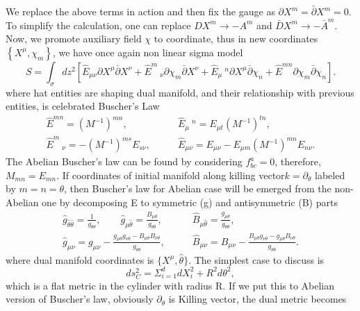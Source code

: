 \documentclass[a4paper]{article}
\begin{document}
 We replace the above terms in action and then fix the gauge as $\partial X^m = \bar{\partial} X^m = 0$. To simplify the calculation, one can replace $DX^m \rightarrow -A^m$ and $\bar{D}X^m \rightarrow -\bar{A}^m$. Now, we promote auxiliary field $\chi$ to coordinate, thus in new coordinates $\left\lbrace X^{\mu}, \chi_m \right\rbrace$, we have once again non linear sigma model
 \begin{equation}
 S= \int_\sigma dz^2 \left[ \hat{E}_{\mu \nu} \partial X^\mu \bar{\partial} X^{\nu} + \hat{E}^{m }~_{\nu} \partial \chi_m \bar{\partial} X^{\nu} + \hat{E}_{\mu }~^{n} \partial X^{\mu} \bar{\partial} \chi_{n} +  \hat{E}^{m n} \partial \chi_m \bar{\partial} \chi_{n} \right].
 \end{equation}
 where hat entities are shaping dual manifold, and their relationship with previous entities, is celebrated Buscher's Law
\begin{align} \nonumber
 \hat{E}^{m n} = (M^{-1})^{m n}, \qquad & \hat{E}_{\mu}~^{ n} = E_{\mu t} (M^{-1})^{t n},
 \\
 \hat{E}^{m}~_{ \nu} = - (M^{-1})^{m s} E_{s \nu}, \qquad &\hat{E}_{\mu \nu} = E_{\mu \nu} - E_{\mu m}(M^{-1})^{m n} E_{n \nu}.
 \end{align}
 The Abelian Buscher's law can be found by considering $f^{a}_{b c} = 0$, therefore, $M_{m n}=E_{m n}$. If coordinates of initial manifold along killing vector$k=\partial_{\theta}$ labeled by $m=n=\theta$, then Buscher's law for Abelian case will be emerged from the non-Abelian one by decomposing E to symmetric (g) and antisymmetric (B) parts
\begin{align}\nonumber
\hat{g}_{\hat{\theta} \hat{\theta}} = \frac{1}{g_{\theta \theta}}, \qquad \hat{g}_{\mu \hat{\theta}} =\frac{B_{\mu \theta}}{g_{\theta \theta}}, \qquad & \hat{B}_{\mu \hat{\theta}} = \frac{g_{\mu \theta}}{g_{\theta \theta}},
\\ \label{abelianbuscher}
\hat{g}_{\mu \nu} =g_{\mu \nu}-\frac{g_{\mu \theta} g_{\nu \theta} - B_{\mu \theta} B_{\nu \theta}}{g_{\theta \theta}}, \qquad &\hat{B}_{\mu \nu} =B_{\mu \nu}-\frac{B_{\mu \theta} g_{\nu \theta} - g_{\mu \theta} B_{\nu \theta}}{g_{\theta \theta}}.
\end{align}
where dual manifold coordinates is $\lbrace X^{\mu}, \hat{\theta} \rbrace$. The simplest case to discuss is
\begin{equation}
ds^2_{C}= \Sigma_{i=1}^{d} dX^2_{i} + R^2 d \theta^2,
\end{equation}
which is a flat metric in the cylinder with radius R.  If we put this to Abelian version of Buscher's law, obviously $\partial_{\theta}$ is Killing vector, the dual metric becomes
\end{document}
